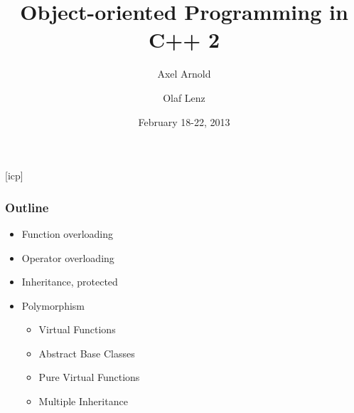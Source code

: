 \documentclass{slides}
\begin{document}
\graphicspath{{figures/}}

\title[Object-oriented Programming in C++ 2]{\Large Object-oriented
  Programming in C++ 2}

\author[A. Arnold and O. Lenz]{Axel Arnold \and Olaf Lenz} 
\date{February 18-22, 2013}

\begin{frame}
  \titlepage
\end {frame}
[icp]

\begin{frame}
  \frametitle{Outline}
  \begin{itemize}
  \item Function overloading
  \item Operator overloading
  \item Inheritance, protected
  \item Polymorphism
    \begin{itemize}
    \item Virtual Functions
    \item Abstract Base Classes
    \item Pure Virtual Functions
    \item Multiple Inheritance
    \end{itemize}
  \end{itemize}
\end{frame}
\end{document}
